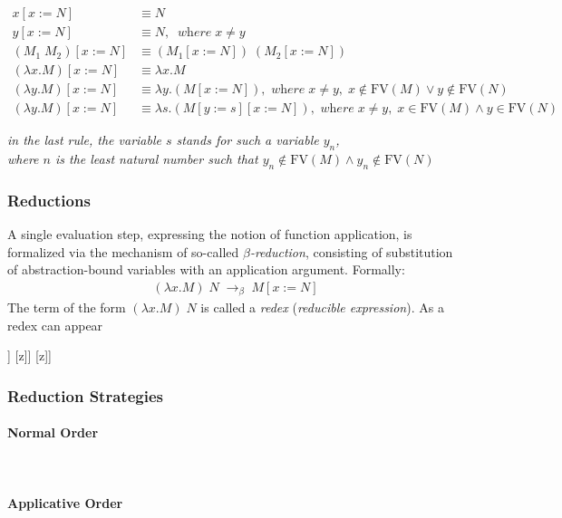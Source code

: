 \documentclass[a4paper,10pt]{article}
\begin{document}
\begin{align*}
	x[x := N] &\equiv N\\
	y[x := N] &\equiv N,\;\;\textit{where}\;x \not= y\\
	(M_1\;M_2)[x := N] &\equiv (M_1[x := N])\;(M_2[x := N])\\
	(\lambda x.M)[x := N] &\equiv \lambda x.M\\
	(\lambda y.M)[x := N] &\equiv \lambda y.(M[x := N]),\textit{ where}\;x \not= y,\;x \not\in \mathrm{FV}(M) \lor y \not\in \mathrm{FV}(N)\\
	(\lambda y.M)[x := N] &\equiv \lambda s.(M[y := s][x := N]),\textit{ where}\;x \not= y,\;x\in \mathrm{FV}(M) \land y \in \mathrm{FV}(N)
\end{align*}
\begin{center}
\textit{in the last rule, the variable $s$ stands for such a variable $y_n$,
\\where $n$ is the least natural number such that $y_n \not\in \mathrm{FV}(M) \land y_n \not\in \mathrm{FV}(N)$}
\end{center}

\subsubsection{Reductions}
A single evaluation step, expressing the notion of function application, is
formalized via the mechanism of so-called $\beta$\textit{-reduction},
consisting of substitution of abstraction-bound variables with an
application argument. Formally:
\begin{align*}
	(\lambda x.M)\;N \;\to_\beta\; M[x := N]
\end{align*}
The term of the form $(\lambda x.M)\;N$ is called a \textit{redex} (\textit{reducible expression}).
As a redex can appear 

\begin{forest}
	[\textit{app} [app [abs [x] [x]] [z]] [z]]
\end{forest}

\subsubsection{Reduction Strategies}
\paragraph{Normal Order}~\\
\paragraph{Applicative Order}~\\
\end{document}

